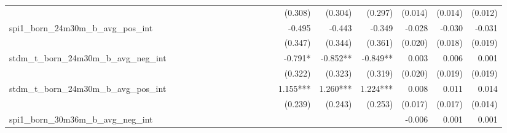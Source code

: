 \begin{tabular}{lrrrrrrrrrrrrrrrrrr}
                                            &              &              &              &              &              &              &              &              &               &              &              &               &      (0.308) &      (0.304) &       (0.297) &      (0.014) &      (0.014) &       (0.012) \\ 
spi1\_born\_24m30m\_b\_avg\_pos\_int        &              &              &              &              &              &              &              &              &               &              &              &               &       -0.495 &       -0.443 &        -0.349 &       -0.028 &       -0.030 &        -0.031 \\ 
                                            &              &              &              &              &              &              &              &              &               &              &              &               &      (0.347) &      (0.344) &       (0.361) &      (0.020) &      (0.018) &       (0.019) \\ 
stdm\_t\_born\_24m30m\_b\_avg\_neg\_int     &              &              &              &              &              &              &              &              &               &              &              &               &      -0.791* &     -0.852** &      -0.849** &        0.003 &        0.006 &         0.001 \\ 
                                            &              &              &              &              &              &              &              &              &               &              &              &               &      (0.322) &      (0.323) &       (0.319) &      (0.020) &      (0.019) &       (0.019) \\ 
stdm\_t\_born\_24m30m\_b\_avg\_pos\_int     &              &              &              &              &              &              &              &              &               &              &              &               &     1.155*** &     1.260*** &      1.224*** &        0.008 &        0.011 &         0.014 \\ 
                                            &              &              &              &              &              &              &              &              &               &              &              &               &      (0.239) &      (0.243) &       (0.253) &      (0.017) &      (0.017) &       (0.014) \\ 
spi1\_born\_30m36m\_b\_avg\_neg\_int        &              &              &              &              &              &              &              &              &               &              &              &               &              &              &               &       -0.006 &        0.001 &         0.001 \\ 

\end{tabular}
